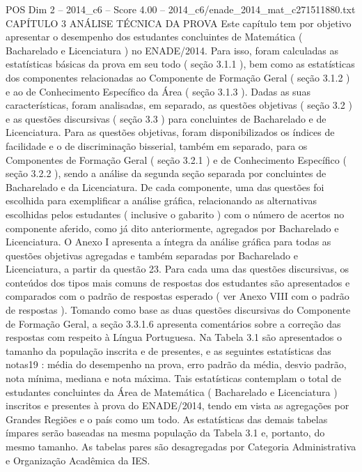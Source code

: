 \begin{textsample}{POS Dim 2 – 2014\_c6 – Score 4.00 – 2014\_c6/enade\_2014\_mat\_c271511880.txt}  \label{ex:f2_pos_225}
CAPÍTULO 3 ANÁLISE TÉCNICA DA PROVA Este capítulo tem por objetivo apresentar o desempenho dos estudantes concluintes de Matemática ( Bacharelado e Licenciatura ) no ENADE/2014.
Para isso, foram calculadas as estatísticas básicas da prova em seu todo ( seção 3.1.1 ), bem como as estatísticas dos componentes relacionadas ao Componente de Formação Geral ( seção 3.1.2 ) e ao de Conhecimento Específico da Área ( seção 3.1.3 ).
Dadas as suas características, foram analisadas, em separado, as questões objetivas ( seção 3.2 ) e as questões discursivas ( seção 3.3 ) para concluintes de Bacharelado e de Licenciatura.
Para as questões objetivas, foram disponibilizados os índices de facilidade e o de discriminação bisserial, também em separado, para os Componentes de Formação Geral ( seção 3.2.1 ) e de Conhecimento Específico ( seção 3.2.2 ), sendo a análise da segunda seção separada por concluintes de Bacharelado e da Licenciatura.
De cada componente, uma das questões foi escolhida para exemplificar a análise gráfica, relacionando as alternativas escolhidas pelos estudantes ( inclusive o gabarito ) com o número de acertos no componente aferido, como já dito anteriormente, agregados por Bacharelado e Licenciatura.
O Anexo I apresenta a íntegra da análise gráfica para todas as questões objetivas agregadas e também separadas por Bacharelado e Licenciatura, a partir da questão 23.
Para cada uma das questões discursivas, os conteúdos dos tipos mais comuns de respostas dos estudantes são apresentados e comparados com o padrão de respostas esperado ( ver Anexo VIII com o padrão de respostas ).
Tomando como base as duas questões discursivas do Componente de Formação Geral, a seção 3.3.1.6 apresenta comentários sobre a correção das respostas com respeito à Língua Portuguesa.
Na Tabela 3.1 são apresentados o tamanho da população inscrita e de presentes, e as seguintes estatísticas das notas19 : média do desempenho na prova, erro padrão da média, desvio padrão, nota mínima, mediana e nota máxima.
Tais estatísticas contemplam o total de estudantes concluintes da Área de Matemática ( Bacharelado e Licenciatura ) inscritos e presentes à prova do ENADE/2014, tendo em vista as agregações por Grandes Regiões e o país como um todo.
As estatísticas das demais tabelas ímpares serão baseadas na mesma população da Tabela 3.1 e, portanto, do mesmo tamanho.
As tabelas pares são desagregadas por Categoria Administrativa e Organização Acadêmica da IES.

\end{textsample}
